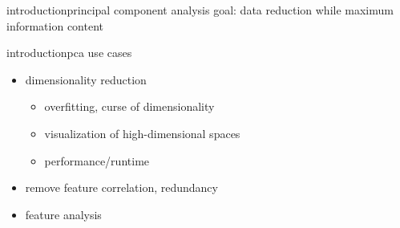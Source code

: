 \begin{frame}{introduction}{principal component analysis}
    goal: data reduction while maximum information content

\end{frame}

\begin{frame}{introduction}{pca use cases}
    \begin{itemize}
        \item   dimensionality reduction
            \begin{itemize}
                \item overfitting, curse of dimensionality
                \item visualization of high-dimensional spaces
                \item performance/runtime
            \end{itemize}
        \item   remove feature correlation, redundancy
        \item   feature analysis
    \end{itemize}
\end{frame}

